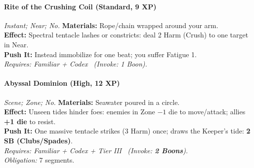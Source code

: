 \paragraph{Rite of the Crushing Coil (Standard, 9 XP)} \emph{Instant; Near; No.}
\textbf{Materials:} Rope/chain wrapped around your arm.\\
\textbf{Effect:} Spectral tentacle lashes or constricts: deal 2 Harm (Crush) to one target in Near.\\
\textbf{Push It:} Instead immobilize for one beat; you suffer Fatigue 1.\\
\emph{Requires: Familiar + Codex \ (\textit{Invoke:} 1 Boon).}

\paragraph{Abyssal Dominion (High, 12 XP)} \emph{Scene; Zone; No.}
\textbf{Materials:} Seawater poured in a circle.\\
\textbf{Effect:} Unseen tides hinder foes: enemies in Zone \(-1\) die to move/attack; allies \textbf{+1 die} to resist.\\
\textbf{Push It:} One massive tentacle strikes (3 Harm) once; draws the Keeper’s tide: \textbf{2 SB (Clubs/Spades)}.\\
\emph{Requires: Familiar + Codex + Tier III \ (\textit{Invoke:} \textbf{2 Boons}).}\\
\emph{Obligation:} 7 segments.
